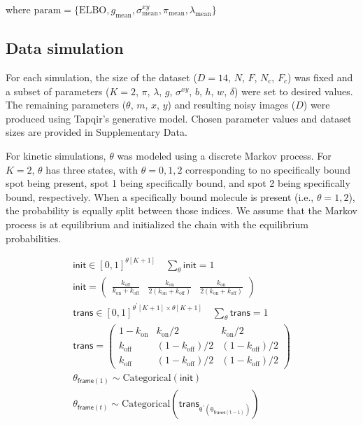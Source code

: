 \noindent where $\mathrm{param} = \{ \mathrm{ELBO}, g_\mathrm{mean}, \sigma^{xy}_\mathrm{mean}, \pi_\mathrm{mean}, \lambda_\mathrm{mean} \}$

\subsection*{Data simulation}

For each simulation, the size of the dataset ($D=14$, $N$, $F$, $N_c$, $F_c$) was fixed and a subset of parameters ($K=2$, $\pi$, $\lambda$, $g$, $\sigma^{xy}$, $b$, $h$, $w$, $\delta$) were set to desired values.  The remaining parameters ($\theta$, $m$, $x$, $y$) and resulting noisy images ($D$) were produced using Tapqir's generative model. Chosen parameter values and dataset sizes are provided in Supplementary Data.

For kinetic simulations, $\theta$ was modeled using a discrete Markov process. For $K=2$, $\theta$ has three states, with $\theta = 0, 1, 2$ corresponding to no specifically bound spot being present, spot 1 being specifically bound, and spot 2 being specifically bound, respectively. When a specifically bound molecule is present (i.e., $\theta = 1, 2$), the probability is equally split between those indices. We assume that the Markov process is at equilibrium and initialized the chain with the equilibrium probabilities.


\begin{gather*}
    \mathsf{init} \in [0, 1]^{\theta[K+1]} \quad \sum_{\theta} \mathsf{init} = 1 \\
    \mathsf{init} = \begin{pmatrix} \frac{k_\mathrm{off}}{k_\mathrm{on} + k_\mathrm{off}} & \frac{k_\mathrm{on}}{2\left( k_\mathrm{on} + k_\mathrm{off} \right)} & \frac{k_\mathrm{on}}{2\left( k_\mathrm{on} + k_\mathrm{off} \right)} \end{pmatrix} \\
    \mathsf{trans} \in [0, 1]^{\theta^\prime[K+1] \times \theta[K+1]} \quad \sum_{\theta} \mathsf{trans} = 1 \\
    \mathsf{trans} = \begin{pmatrix} 1 - k_\mathrm{on} & k_\mathrm{on}/2 & k_\mathrm{on}/2 \\ k_\mathrm{off} & (1 - k_\mathrm{off})/2 & (1 - k_\mathrm{off})/2 \\ k_\mathrm{off} & (1 - k_\mathrm{off})/2 & (1 - k_\mathrm{off})/2 \end{pmatrix} \\
    \theta_{\mathsf{frame}(1)} \sim \mathrm{Categorical(\mathsf{init})} \\
    \theta_{\mathsf{frame}(t)} \sim \mathrm{Categorical(\mathsf{trans}_{\theta^\prime( \theta_{\mathsf{frame}(t-1)})})}
\end{gather*}

